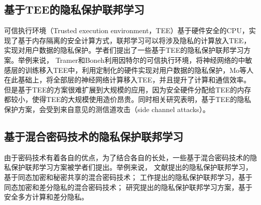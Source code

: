 \subsection{基于TEE的隐私保护联邦学习}
可信执行环境（Trusted execution environment，TEE）基于硬件安全的CPU，实现了基于内存隔离的安全计算方式，联邦学习可以将涉及隐私的计算放入TEE，实现对用户数据的隐私保护。学者们提出了一些基于TEE的隐私保护联邦学习方案\cite{tramer2018slalom, mo2019efficient, mo2021ppfl, mo2020darknetz}。举例来说，
Tramer和Boneh\cite{tramer2018slalom}利用因特尔的可信执行环境，将神经网络的中敏感层的训练移入TEE中，利用定制化的硬件实现对用户数据的隐私保护，Mo等人\cite{mo2021ppfl}在此基础上，将全部层的神经网络计算移入TEE，并且提升了计算和通信效率。但是基于TEE的方案很难扩展到大规模的应用，因为安全硬件分配给TEE的内存都较小，使得TEE的大规模使用造价昂贵。同时相关研究\cite{van2018foreshadow}表明，基于TEE的隐私保护方案，会受到来自意见的测信道攻击（side channel attacks）。

\subsection{基于混合密码技术的隐私保护联邦学习}
由于密码技术有着各自的优点，为了结合各自的长处，一些基于混合密码技术的隐私保护联邦学习方案\cite{choquette2021capc, hao2019efficient, hao2019towards, mugunthan2019smpai, truex2019hybrid, xu2019verifynet, xu2019hybridalpha, zhang2020privacy, zhao2020smss}被学者们提出。举例来说，
文献\cite{xu2019verifynet, zhao2020smss}提出的隐私保护联邦学习，基于同态加密和秘密共享的混合密码技术；
工作\cite{hao2019efficient, hao2019towards}提出的隐私保护联邦学习，基于同态加密和差分隐私的混合密码技术；
研究\cite{mugunthan2019smpai, truex2019hybrid, xu2019hybridalpha}提出的隐私保护联邦学习方案，基于安全多方计算和差分隐私。

